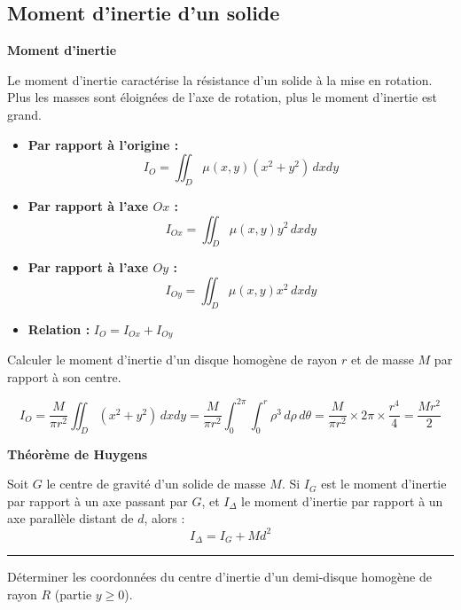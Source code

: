 \documentclass[../PolyS2.tex]{subfiles}
\begin{document}
\subsection{Moment d'inertie d'un solide}

\begin{Def}\textbf{Moment d'inertie}

Le moment d'inertie caractérise la résistance d'un solide à la mise en rotation. Plus les masses sont éloignées de l'axe de rotation, plus le moment d'inertie est grand.

\begin{itemize}
\item \textbf{Par rapport à l'origine :}
$$I_O = \iint_D \mu(x,y)(x^2+y^2) \, dxdy$$

\item \textbf{Par rapport à l'axe $Ox$ :}
$$I_{Ox} = \iint_D \mu(x,y) y^2 \, dxdy$$

\item \textbf{Par rapport à l'axe $Oy$ :}
$$I_{Oy} = \iint_D \mu(x,y) x^2 \, dxdy$$

\item \textbf{Relation :} $I_O = I_{Ox} + I_{Oy}$
\end{itemize}
\end{Def}

\begin{Ex}
Calculer le moment d'inertie d'un disque homogène de rayon $r$ et de masse $M$ par rapport à son centre.

$$I_O = \frac{M}{\pi r^2} \iint_D (x^2+y^2) \, dxdy = \frac{M}{\pi r^2} \int_0^{2\pi} \int_0^r \rho^3 \, d\rho \, d\theta = \frac{M}{\pi r^2} \times 2\pi \times \frac{r^4}{4} = \frac{Mr^2}{2}$$
\end{Ex}

\begin{Thm}\textbf{Théorème de Huygens}

Soit $G$ le centre de gravité d'un solide de masse $M$. Si $I_G$ est le moment d'inertie par rapport à un axe passant par $G$, et $I_\Delta$ le moment d'inertie par rapport à un axe parallèle distant de $d$, alors :
$$I_\Delta = I_G + Md^2$$
\end{Thm}

\vspace{1em}\hrule\vspace{1em}


Déterminer les coordonnées du centre d'inertie d'un demi-disque homogène de rayon $R$ (partie $y \geq 0$).
\end{document}
